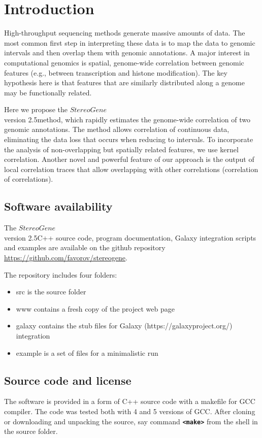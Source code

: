 \documentclass{article}
\title {\sg}
\author{User manual}
\newcommand{\prm}[1]{\texttt{\textbf{{#1}}}}
\newcommand{\sg}{$StereoGene$\\ version 2.5}
\begin{document}
\maketitle 

\tableofcontents

\section{Introduction}

High-throughput sequencing methods generate massive amounts of data.  The most common first step in interpreting these data is to map the data to genomic intervals and then overlap them with genomic annotations. A major interest in computational genomics is spatial, genome-wide correlation between genomic features (e.g., between transcription and histone modification). The key hypothesis here is that features that are similarly distributed along a genome may be functionally related.

Here we propose the \sg method, which rapidly estimates the genome-wide correlation of two genomic annotations. The method allows correlation of continuous data, eliminating the data loss that occurs when reducing to intervals. To incorporate the analysis of non-overlapping but spatially related features, we use kernel correlation.  Another novel and powerful feature of our approach is the output of local correlation traces that allow overlapping with other correlations (correlation of correlations). 
\subsection{Software availability}
The \sg C++ source code, program documentation, Galaxy integration scripts and examples are available on the  github repository \url{https://github.com/favorov/stereogene}.

The repository includes four folders: 
\begin{itemize}
\item src is the source folder
\item www contains a fresh copy of the project web page
\item galaxy contains the stub files for Galaxy (https://galaxyproject.org/) integration
\item example is a set of files for a minimalistic run 
\end{itemize}

\subsection{Source code and license}
The software is provided in a form of C++ source code with a makefile for GCC compiler. The code was tested both with 4 and 5 versions of GCC. After cloning or downloading and unpacking the source, say command \prm{<make>} from the shell in the source folder. 
\end{document}
